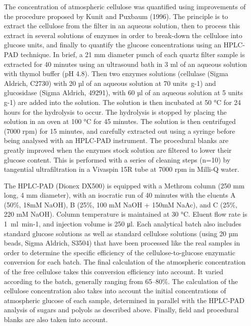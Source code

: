 The concentration of atmospheric cellulose was quantified using improvements of the
procedure proposed by Kunit and Puxbaum (1996). The principle is to extract the cellulose
from the filter in an aqueous solution, then to process this extract in several solutions
of enzymes in order to break-down the cellulose into glucose units, and finally to
quantify the glucose concentrations using an HPLC-PAD technique. In brief, a 21 mm
diameter punch of each quartz filter sample is extracted for 40 minutes using an
ultrasound bath in 3 ml of an aqueous solution with thymol buffer (pH 4.8). Then two
enzymes solutions (cellulase (Sigma Aldrich, C2730) with 20 µl of an aqueous solution at
70 units g-1) and glucosidase (Sigma Aldrich, 49291), with 60 µl of an aqueous solution at
5 units g-1) are added into the solution. The solution is then incubated at 50 °C for 24
hours for the hydrolysis to occur. The hydrolysis is stopped by placing the solution in an
oven at 100 °C for 45 minutes. The solution is then centrifuged (7000 rpm) for 15 minutes,
and carefully extracted out using a syringe before being analysed with an HPLC-PAD
instrument. The procedural blanks are greatly improved when the enzymes stock solution are
filtered to lower their glucose content. This is performed with a series of cleaning steps
(n=10) by tangential ultrafiltration in a Vivaspin 15R tube at 7000 rpm in Milli-Q water.

The HPLC-PAD (Dionex DX500) is equipped with a Methrom column (250 mm long, 4 mm
diameter), with an isocratic run of 40 minutes with the eluents A (50\%, 18mM NaOH), B
(25\%, 100 mM NaOH + 150mM NaAc), and C (25\%, 220 mM NaOH). Column temperature is
maintained at 30 °C. Eluent flow rate is 1 ml min-1, and injection volume is 250 μl. Each
analytical batch also includes standard glucose solutions as well as standard cellulose
solutions (using 20 µm beads, Sigma Aldrich, S3504) that have been processed like the real
samples in order to determine the specific efficiency of the cellulose-to-glucose
enzymatic conversion for each batch. The final calculation of the atmospheric
concentration of the free cellulose takes this conversion efficiency into account. It
varied according to the batch, generally ranging from 65–80\%. The calculation of the
cellulose concentration also takes into account the initial concentrations of atmospheric
glucose of each sample, determined in parallel with the HPLC-PAD analysis of sugars and
polyols as described above. Finally, field and procedural blanks are also taken into
account.

